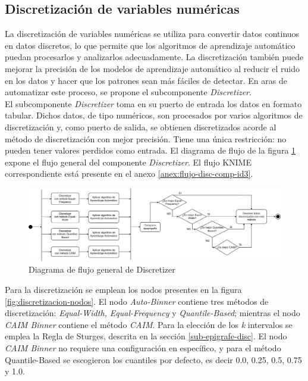 \subsection{Discretización de variables numéricas} 
La discretización de variables numéricas se utiliza para convertir datos continuos en datos discretos, lo que permite que los algoritmos de aprendizaje automático puedan procesarlos y analizarlos adecuadamente. La discretización también puede mejorar la precisión de los modelos de aprendizaje automático al reducir el ruido en los datos y hacer que los patrones sean más fáciles de detectar. En aras de automatizar este proceso, se propone el subcomponente \textit{Discretizer}. \\
El subcomponente \textit{Discretizer} toma en su puerto de entrada los datos en formato tabular. Dichos datos, de tipo numéricos, son procesados por varios algoritmos de discretización y, como puerto de salida, se obtienen discretizados acorde al método de discretización con mejor precisión. Tiene una única restricción: no pueden tener valores perdidos como entrada. El diagrama de flujo de la figura \ref{fig:discretizacion} expone el flujo general del componente \textit{Discretizer}. El flujo KNIME correspondiente está presente en el anexo \ref{anex:flujo-disc-comp-id3}.

\begin{figure}[H]
	\centering
	\includegraphics[width=1\linewidth]{"figuras/capi 2/preprocesado/discretizacion.drawio"}
	\caption{Diagrama de flujo general de Discretizer}
	\label{fig:discretizacion}
\end{figure}

Para la discretización se emplean los nodos presentes en la figura \ref{fig:discretizacion-nodos}. El nodo \textit{Auto-Binner} contiene tres métodos de discretización: \textit{Equal-Width, Equal-Frequency} y \textit{Quantile-Based}; mientras el nodo \textit{CAIM Binner} contiene el método \textit{CAIM}. Para la elección de los \textit{k} intervalos se emplea la Regla de Sturges, descrita en la sección \ref{sub-epigrafe-disc}. El nodo \textit{CAIM Binner} no requiere una configuración en específico, y para el método Quantile-Based se escogieron los cuantiles por defecto, es decir 0.0, 0.25, 0.5, 0.75 y 1.0.

